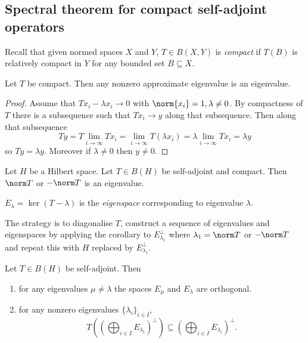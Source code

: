 \documentclass[a4paper]{article}
\begin{document}
\subsection{Spectral theorem for compact self-adjoint operators}

Recall that given normed spaces \(X\) and \(Y\), \(T \in B(X, Y)\) is \emph{compact} if \(T(B)\) is relatively compact in \(Y\) for any bounded set \(B \subseteq X\).

\begin{lemma}
  Let \(T\) be compact. Then any nonzero approximate eigenvalue is an eigenvalue.
\end{lemma}

\begin{proof}
  Assume that \(Tx_i - \lambda x_i \to 0\) with \(\norm{x_i} = 1, \lambda \neq 0\). By compactness of \(T\) there is a subsequence such that \(Tx_i \to y\) along that subsequence. Then along that subsequence
  \[
    Ty
    = T \lim_{i \to \infty} Tx_i
    = \lim_{i \to \infty} T(\lambda x_i)
    = \lambda \lim_{i \to \infty} Tx_i
    = \lambda y
  \]
  so \(Ty = \lambda y\). Moreover if \(\lambda \neq 0\) then \(y \neq 0\).
\end{proof}

\begin{corollary}
  Let \(H\) be a Hilbert space. Let \(T \in B(H)\) be self-adjoint and compact. Then \(\norm T\) or \(- \norm T\) is an eigenvalue.
\end{corollary}

\begin{notation}
  \(E_\lambda = \ker (T - \lambda)\) is the \emph{eigenspace} corresponding to eigenvalue \(\lambda\).
\end{notation}

The strategy is to diagonalise \(T\), construct a sequence of eigenvalues and eigenspaces by applying the corollary to \(E_{\lambda_1}^\perp\) where \(\lambda_1 = \norm T\) or \(- \norm T\) and repeat this with \(H\) replaced by \(E_{\lambda_1}^\perp\).

\begin{lemma}
  Let \(T \in B(H)\) be self-adjoint. Then
  \begin{enumerate}
  \item for any eigenvalues \(\mu \neq \lambda\) the spaces \(E_\mu\) and \(E_\lambda\) are orthogonal.
  \item for any nonzero eigenvalues \(\{\lambda_i\}_{i \in I}\),
    \[
      T((\bigoplus_{i \in I} E_{\lambda_i})^\perp) \subseteq (\bigoplus_{i \in I} E_{\lambda_i})^\perp.
    \]
  \end{enumerate}
\end{lemma}
\end{document}
